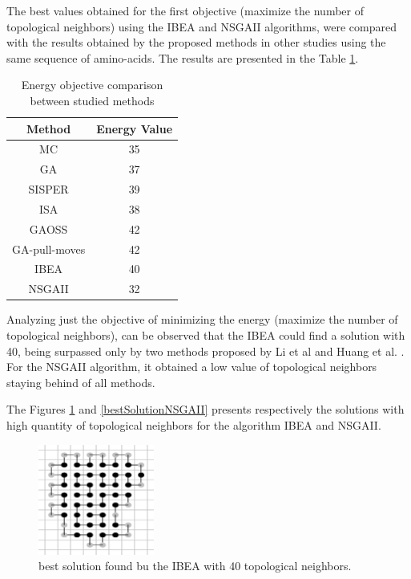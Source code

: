 \documentclass[conference]{IEEEtran}
\begin{document}
The best values obtained for the first objective (maximize the number of topological neighbors) using the IBEA and NSGAII algorithms, were compared with the results obtained by the proposed methods in other studies using the same sequence of amino-acids. The results are presented in the Table \ref{tab:comparacao}.


\begin{table}[h]
	\centering
	\caption{Energy objective comparison between studied methods}
	\label{tab:comparacao}
	\begin{tabular}{|c|c|}
		\hline
		{\bf Method} & {\bf Energy Value} \\ \hline
		MC \cite{unger1993genetic}               & 35                          \\ \hline
		GA   \cite{unger1993genetic}               & 37                          \\ \hline
		SISPER  \cite{zhang2002new}            & 39                          \\ \hline
		ISA \cite{huang2005improved}                & 38                          \\ \hline
		GAOSS  \cite{huang2010protein}             & 42                          \\ \hline
		GA-pull-moves \cite{li2012genetic}      & 42                          \\ \hline
		IBEA                & 40          \\ \hline 
		NSGAII & 32 \\
		\hline
	\end{tabular}
\end{table}


Analyzing just the objective of minimizing the energy (maximize the number of topological neighbors), can be observed that the IBEA could find a solution with 40, being surpassed only by two methods proposed by Li et al \cite{li2012genetic} and Huang et al. \cite{huang2010protein}. For the NSGAII algorithm, it obtained a low value of topological neighbors staying behind of all methods.


The Figures \ref{bestSolutionIBEA} and \ref{bestSolutionNSGAII} presents respectively the solutions with high quantity of topological neighbors for the algorithm IBEA and NSGAII.


\begin{figure}[ht]
	\centering
	\includegraphics[width=1.5in]{figures/ibeabestresults.png}
	\caption{best solution found bu the IBEA with 40 topological neighbors.}
	\label{bestSolutionIBEA}
\end{figure}
\end{document}
